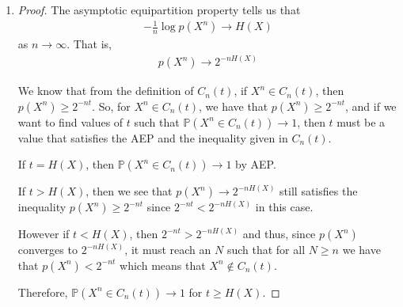 \documentclass[10pt,twoside]{article}
\newcommand{\Pro}{\ensuremath{\mathbb{P}}}
\begin{document}
\begin{itemize}
\begin{enumerate}
        \item \begin{proof}
            The asymptotic equipartition property tells us that 
            \begin{gather*}
                -\frac{1}{n}\log p(X^n) \to H(X)
            \end{gather*}
            as $n\to \infty$. That is,
            \begin{gather*}
                p(X^n) \to 2^{-nH(X)}
            \end{gather*}
            
            We know that from the definition of $C_n(t)$, if $X^n\in C_n(t)$, then $p(X^n) \geq 2^{-nt}$. So, for $X^n\in C_n(t)$, we have that $p(X^n)\geq 2^{-nt}$, and if we want to find values of $t$ such that $\Pro(X^n\in C_n(t))\to 1$, then $t$ must be a value that satisfies the AEP and the inequality given in $C_n(t)$. 
            
            If $t = H(X)$, then $\Pro(X^n\in C_n(t))\to 1$ by AEP.
            
            If $t > H(X)$, then we see that $p(X^n)\to 2^{-nH(X)}$ still satisfies the inequality $p(X^n)\geq 2^{-nt}$ since $2^{-nt} < 2^{-nH(X)}$ in this case.
            
            However if $t<H(X)$, then $2^{-nt} > 2^{-nH(X)}$ and thus, since $p(X^n)$ converges to $2^{-nH(X)}$, it must reach an $N$ such that for all $N\geq n$ we have that $p(X^n) < 2^{-nt}$ which means that $X^n\not\in C_n(t)$.

            Therefore, $\Pro(X^n\in C_n(t))\to 1$ for $t \geq H(X)$.
        \end{proof}
        
    \end{enumerate}
\end{itemize}

\label{LastPage}
\end{document}
